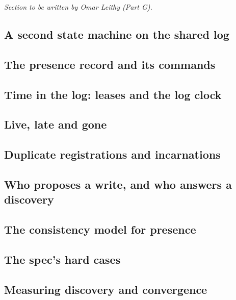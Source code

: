 
\tbd{} \emph{Section to be written by Omar Leithy (Part G).}

\subsection{A second state machine on the shared log}

\subsection{The presence record and its commands}

\subsection{Time in the log: leases and the log clock}

\subsection{Live, late and gone}

\subsection{Duplicate registrations and incarnations}

\subsection{Who proposes a write, and who answers a discovery}

\subsection{The consistency model for presence}

\subsection{The spec's hard cases}

\subsection{Measuring discovery and convergence}
